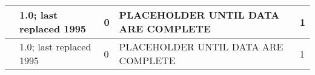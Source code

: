 \begin{tabular}{V{.25\columnwidth}|V{.15\columnwidth}|V{.15\columnwidth}|V{.25\columnwidth}|V{.15\columnwidth}|}
        & 1.0; last replaced 1995                                                & 0                                                                  & PLACEHOLDER UNTIL DATA ARE COMPLETE & 1                                                            \\ \hline
{}        & 1.0; last replaced 1995                                                & 0                                                                  & PLACEHOLDER UNTIL DATA ARE COMPLETE & 1                                                            \\ \hline
\end{tabular}